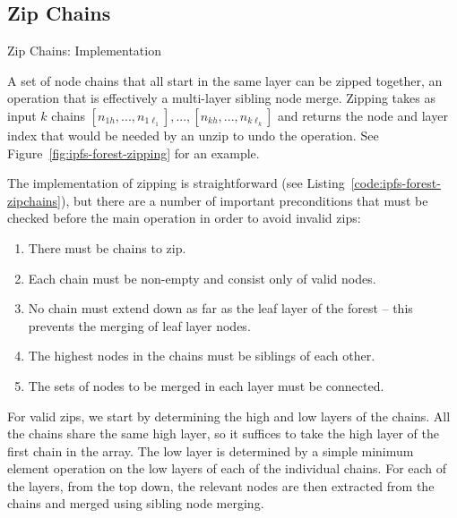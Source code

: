 \documentclass[10pt,twocolumn,twoside]{IEEEtran}
\begin{document}

\subsection{Zip Chains}

\begin{stulisting}[t]
\caption{Zip Chains: Implementation}
\label{code:ipfs-forest-zipchains}

\end{stulisting}

A set of node chains that all start in the same layer can be zipped together, an operation that is effectively a multi-layer sibling node merge. Zipping takes as input $k$ chains $[n_{1h},...,n_{1\ell_1}],...,[n_{kh},...,n_{k\ell_k}]$ and returns the node and layer index that would be needed by an unzip to undo the operation. See Figure~\ref{fig:ipfs-forest-zipping} for an example.

The implementation of zipping is straightforward (see Listing~\ref{code:ipfs-forest-zipchains}), but there are a number of important preconditions that must be checked before the main operation in order to avoid invalid zips:
%
\begin{enumerate}
\item There must be chains to zip.
\item Each chain must be non-empty and consist only of valid nodes.
\item No chain must extend down as far as the leaf layer of the forest -- this prevents the merging of leaf layer nodes.
\item The highest nodes in the chains must be siblings of each other.
\item The sets of nodes to be merged in each layer must be connected.
\end{enumerate}
%
For valid zips, we start by determining the high and low layers of the chains. All the chains share the same high layer, so it suffices to take the high layer of the first chain in the array. The low layer is determined by a simple minimum element operation on the low layers of each of the individual chains. For each of the layers, from the top down, the relevant nodes are then extracted from the chains and merged using sibling node merging.
\end{document}
